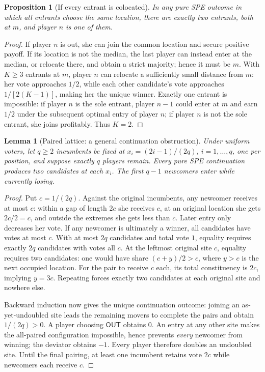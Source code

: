 \documentclass[10pt]{article}
\newtheorem{proposition}{Proposition}
\newtheorem{lemma}{Lemma}
\newcommand{\OUT}{\mathsf{OUT}}
\begin{document}
\begin{proposition}[If every entrant is colocated]\label{prop:colo}
In any pure SPE outcome in which all entrants choose the same location, there are exactly two entrants, both at $m$, and player $n$ is one of them.
\end{proposition}
\begin{proof}
If player $n$ is out, she can join the common location and secure positive payoff. If its location is not the median, the last player can instead enter at the median, or relocate there, and obtain a strict majority; hence it must be $m$. With $K\ge3$ entrants at $m$, player $n$ can relocate a sufficiently small distance from $m$: her vote approaches $1/2$, while each other candidate's vote approaches $1/[2(K-1)]$, making her the unique winner. Exactly one entrant is impossible: if player $n$ is the sole entrant, player $n-1$ could enter at $m$ and earn $1/2$ under the subsequent optimal entry of player $n$; if player $n$ is not the sole entrant, she joins profitably. Thus $K=2$.
\end{proof}

\begin{lemma}[Paired lattice: a general continuation obstruction]\label{lem:lattice}
Under uniform voters, let $q\ge2$ incumbents be fixed at $x_i=(2i-1)/(2q)$, $i=1,\ldots,q$, one per position, and suppose exactly $q$ players remain. Every pure SPE continuation produces two candidates at each $x_i$. The first $q-1$ newcomers enter while currently losing.
\end{lemma}
\begin{proof}
Put $c=1/(2q)$. Against the original incumbents, any newcomer receives at most $c$: within a gap of length $2c$ she receives $c$, at an original location she gets $2c/2=c$, and outside the extremes she gets less than $c$. Later entry only decreases her vote. If any newcomer is ultimately a winner, all candidates have votes at most $c$. With at most $2q$ candidates and total vote $1$, equality requires exactly $2q$ candidates with votes all $c$. At the leftmost original site $c$, equality requires two candidates: one would have share $(c+y)/2>c$, where $y>c$ is the next occupied location. For the pair to receive $c$ each, its total constituency is $2c$, implying $y=3c$. Repeating forces exactly two candidates at each original site and nowhere else.

Backward induction now gives the unique continuation outcome: joining an as-yet-undoubled site leads the remaining movers to complete the pairs and obtain $1/(2q)>0$. A player choosing $\OUT$ obtains $0$. An entry at any other site makes the all-paired configuration impossible, hence prevents \emph{every} newcomer from winning; the deviator obtains $-1$. Every player therefore doubles an undoubled site. Until the final pairing, at least one incumbent retains vote $2c$ while newcomers each receive $c$.
\end{proof}
\end{document}
